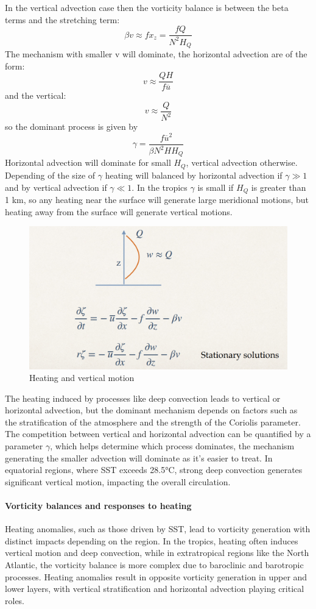 In the vertical advection case then the vorticity balance is between the beta terms and the stretching term:
$$\beta v\approx fx_z=\frac{fQ}{N^2H_Q}$$
The mechanism with smaller v will dominate, the horizontal advection are of the form:
$$v\approx\frac{QH}{f\overline{u}}$$
and the vertical:
$$v\approx\frac{Q}{N^2}$$
so the dominant process is given by
\begin{equation}
	\gamma=\frac{f\overline{u}^2}{\beta N^2HH_Q}
\end{equation}
Horizontal advection will dominate for small $H_Q$, vertical
advection otherwise. Depending of the size of $\gamma$ heating will balanced by horizontal advection if $\gamma \gg 1$ and by vertical advection if $\gamma\ll 1$.
In the tropics $\gamma$ is small if $H_Q$ is greater than 1 km, so any heating near the surface will generate large meridional motions, but heating away from the surface will generate vertical motions.
\begin{figure}[htp!]
	\centering
	\includegraphics[width=0.5\linewidth]{uploads/Screenshot 2024-11-26 105240.png}
	\caption{Heating and vertical motion}
	\label{fig:enter-label}
\end{figure}


The heating induced by processes like deep convection leads to vertical or horizontal advection, but the dominant mechanism depends on factors such as the stratification of the atmosphere and the strength of the Coriolis parameter. The competition between vertical and horizontal advection can be quantified by a parameter $\gamma$, which helps determine which process dominates, the mechanism generating the smaller advection will dominate as it's easier to treat. In equatorial regions, where SST exceeds 28.5°C, strong deep convection generates significant vertical motion, impacting the overall circulation.

\paragraph{Vorticity balances and responses to heating}
Heating anomalies, such as those driven by SST, lead to vorticity generation with distinct impacts depending on the region. In the tropics, heating often induces vertical motion and deep convection, while in extratropical regions like the North Atlantic, the vorticity balance is more complex due to baroclinic and barotropic processes. Heating anomalies result in opposite vorticity generation in upper and lower layers, with vertical stratification and horizontal advection playing critical roles.

